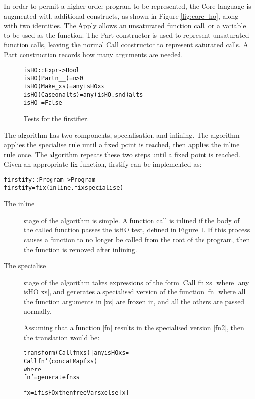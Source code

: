 \documentclass[preprint]{sigplanconf}
\newcommand{\C}[1]{\textsf{#1}}
\newenvironment{code}{\begin{alltt}\small}{\end{alltt}}
\begin{document}
In order to permit a higher order program to be represented, the Core language is augmented with additional constructs, as shown in Figure \ref{fig:core_ho}, along with two identities. The \C{Apply} allows an unsaturated function call, or a variable to be used as the function. The \C{Part} constructor is used to represent unsaturated function calls, leaving the normal \C{Call} constructor to represent saturated calls. A \C{Part} construction records how many arguments are needed.

\begin{figure}
\begin{code}
isHO :: Expr -> Bool
isHO (Part n _ _)    = n > 0
isHO (Make _ xs)     = any isHO xs
isHO (Case on alts)  = any (isHO . snd) alts
isHO _               = False
\end{code}
\caption{Tests for the firstifier.}
\label{fig:isHO}
\end{figure}

The algorithm has two components, specialisation and inlining. The algorithm applies the specialise rule until a fixed point is reached, then applies the inline rule once. The algorithm repeats these two steps until a fixed point is reached. Given an appropriate \C{fix} function, \C{firstify} can be implemented as:

\begin{code}
firstify :: Program -> Program
firstify = fix (inline . fix specialise)
\end{code}

\begin{description}
\item[The \C{inline}] stage of the algorithm is simple. A function call is inlined if the body of the called function passes the \C{isHO} test, defined in Figure \ref{fig:isHO}. If this process causes a function to no longer be called from the root of the program, then the function is removed after inlining.

\item[The \C{specialise}] stage of the algorithm takes expressions of the form |Call fn xs| where |any isHO xs|, and generates a specialised version of the function |fn| where all the function arguments in |xs| are frozen in, and all the others are passed normally.

    Assuming that a function |fn| results in the specialised version |fn2|, then the translation would be:

    \begin{code}
    transform (Call fn xs) | any isHO xs =
        Call fn' (concatMap f xs)
        where
        fn' = generate fn xs

        f x = if isHO x then freeVars x else [x]
    \end{code}
\end{description}
\end{document}
